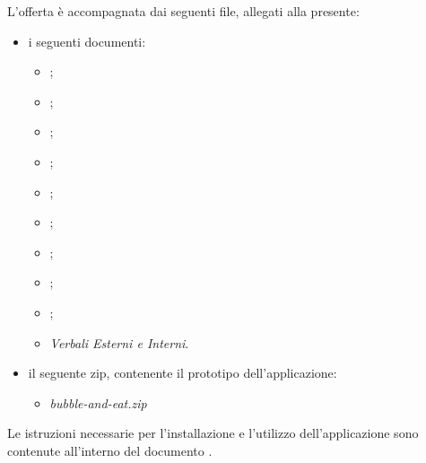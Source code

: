 \begin{titlepage}
\begin{large}
	L'offerta è accompagnata dai seguenti file, allegati alla presente: 
	\begin{itemize}
		\item i seguenti documenti:
		\begin{itemize}
			\item \AnalisiDeiRequisiti{};
			\item \DefinizioneDiProdotto{};
			\item \ManualeUtenteDemo{};
			\item \ManualeUtenteFramework{};
			\item \Glossario{};
			\item \NormeDiProgetto{};
			\item \PianoDiProgetto{};
			\item \PianoDiQualifica{};
			\item \SpecificaTecnica{};
			\item \emph{Verbali Esterni e Interni}.
		\end{itemize}
		\item il seguente zip, contenente il prototipo dell'applicazione:
		\begin{itemize}
			\item \textit{bubble-and-eat.zip}
		\end{itemize}
	\end{itemize}

	\vspace{0.5cm}
	
	Le istruzioni necessarie per l'installazione e l'utilizzo dell'applicazione sono contenute all'interno del documento \ManualeUtenteDemo{}.\\
	\vspace{0.3cm}
	\end{large}
\end{titlepage}

